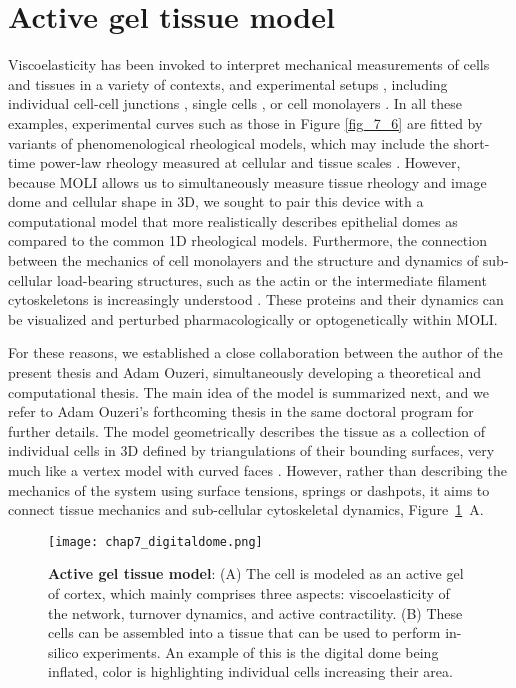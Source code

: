 
\hypertarget{active-gel-tissue-model}{%
	\section{Active gel tissue model}\label{active-gel-tissue-model}}


Viscoelasticity has been invoked to interpret mechanical measurements of cells and tissues in a variety of contexts, and experimental setups \cite{PULLARKAT200729}, including individual cell-cell junctions \cite{clement2017}, single cells \cite{PhysRevLett.94.098103,Fischer-Friedrich:2016aa}, or cell monolayers \cite{Fernandez_2007,khalilgharibi2019}. In all these examples, experimental curves such as those in Figure \ref{fig_7_6} are fitted by variants of phenomenological rheological models, which may include the short-time power-law rheology measured at cellular and tissue scales   \cite{PULLARKAT200729,doi:10.1098/rsos.190920,khalilgharibi2019}. However, because MOLI allows us to simultaneously measure tissue rheology and image dome and cellular shape in 3D, we sought to pair this device with a computational model that more realistically describes epithelial domes as compared to the common 1D rheological models. Furthermore, the connection between the mechanics of cell monolayers and the structure and dynamics of sub-cellular load-bearing structures, such as the actin or the intermediate filament cytoskeletons is increasingly understood \cite{latorre2018,khalilgharibi2019,duque2023}. These proteins and their dynamics can be visualized and perturbed pharmacologically or optogenetically within MOLI.

For these reasons, we established a close collaboration between the author of the present thesis and Adam Ouzeri, simultaneously developing a theoretical and computational thesis. The main idea of the model is summarized next, and we refer to Adam Ouzeri's forthcoming thesis in the same doctoral program for further details. The model geometrically describes the tissue as a collection of individual cells in 3D defined by triangulations of their bounding surfaces, very much like a vertex model with curved faces \cite{alt2017,perez-gonzalez2021}. However, rather than describing the mechanics of the system using surface tensions, springs or dashpots, it aims to connect tissue mechanics and sub-cellular cytoskeletal dynamics, Figure~\ref{fig_7_2}~A. 

\begin{figure}
	\centering
	\texttt{[image: chap7\_digitaldome.png]}
	\caption{\label{fig_7_2} \textbf{Active gel tissue model}: (A) The cell is modeled as an active gel of cortex, which mainly comprises three aspects: viscoelasticity of the network, turnover dynamics, and active contractility. (B) These cells can be assembled into a tissue that can be used to perform in-silico experiments. An example of this is the digital dome being inflated, color is highlighting individual cells increasing their area.}
\end{figure}



